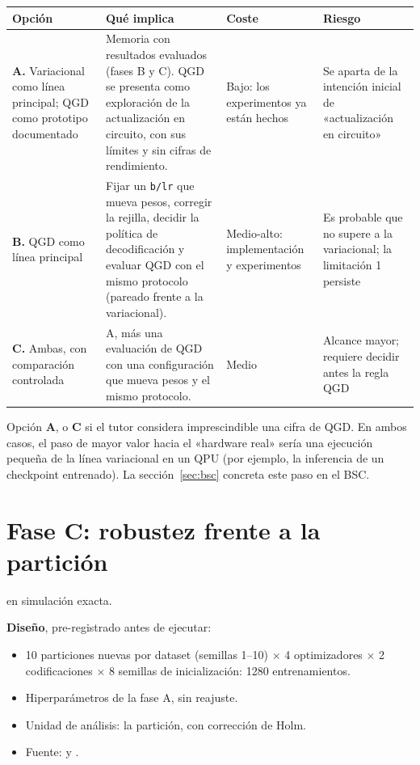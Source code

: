 \documentclass[11pt,a4paper]{article}
\begin{document}
\begin{table}[H]
\centering\small
\begin{tabularx}{\linewidth}{>{\raggedright\arraybackslash}p{3.3cm} >{\raggedright\arraybackslash}X >{\raggedright\arraybackslash}p{2.6cm} >{\raggedright\arraybackslash}p{3.3cm}}
\toprule
Opción & Qué implica & Coste & Riesgo \\
\midrule
\textbf{A.} Variacional como línea principal; QGD como prototipo documentado &
  Memoria con resultados evaluados (fases B y C). QGD se presenta como exploración de la actualización en circuito,
  con sus límites y sin cifras de rendimiento. &
  Bajo: los experimentos ya están hechos & Se aparta de la intención inicial de «actualización en circuito» \\
\addlinespace
\textbf{B.} QGD como línea principal &
  Fijar un \texttt{b/lr} que mueva pesos, corregir la rejilla, decidir la política de decodificación y evaluar QGD
  con el mismo protocolo (pareado frente a la variacional). &
  Medio-alto: implementación y experimentos & Es probable que no supere a la variacional; la limitación 1 persiste \\
\addlinespace
\textbf{C.} Ambas, con comparación controlada &
  A, más una evaluación de QGD con una configuración que mueva pesos y el mismo protocolo. &
  Medio & Alcance mayor; requiere decidir antes la regla QGD \\
\bottomrule
\end{tabularx}
\end{table}

\begin{keybox}
Opción \textbf{A}, o \textbf{C} si el tutor considera imprescindible una cifra de QGD. En ambos casos, el paso de
mayor valor hacia el «hardware real» sería una ejecución pequeña de la línea variacional en un QPU (por
ejemplo, la inferencia de un checkpoint entrenado). La sección~\ref{sec:bsc} concreta este paso en el BSC.
\end{keybox}

\section{Fase C: robustez frente a la partición}\label{sec:faseC}

 en simulación exacta.

\textbf{Diseño}, pre-registrado antes de ejecutar:
\begin{itemize}
  \item 10 particiones nuevas por dataset (semillas 1--10) $\times$ 4 optimizadores $\times$ 2 codificaciones
        $\times$ 8 semillas de inicialización: 1280 entrenamientos.
  \item Hiperparámetros de la fase A, sin reajuste.
  \item Unidad de análisis: la partición, con corrección de Holm.
  \item Fuente:  y .
\end{itemize}
\end{document}
